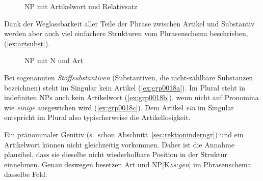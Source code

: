 \begin{figure}[!htbp]
  \centering
  \caption{NP mit Artikelwort und Relativsatz}
  \label{fig:grp7000}
\end{figure}

Dank der Weglassbarkeit aller Teile der Phrase zwischen Artikel und Substantiv werden aber auch viel einfachere Strukturen vom Phrasenschema beschrieben, \zB (\ref{ex:artsubst}).

\begin{exe}
\end{exe}

\begin{figure}[!htbp]
  \centering
  \caption{NP mit N und Art}
  \label{fig:artsubst}
\end{figure}


Bei sogenannten \textit{Stoffsubstantiven} (Substantiven, die nicht-zählbare Substanzen bezeichnen) steht im Singular kein Artikel (\ref{ex:grp0018a}).
Im Plural steht in indefiniten NPs auch kein Artikelwort (\ref{ex:grp0018b}), wenn nicht auf Pronomina wie \textit{einige} ausgewichen wird (\ref{ex:grp0018c}).
Dem Artikel \textit{ein} im Singular entspricht im Plural also typischerweise die Artikellosigkeit.

\begin{exe}
  \ex\label{ex:grp0018} 
  \begin{xlist}
  \end{xlist}
\end{exe}

Ein pränominaler Genitiv (s.\ schon Abschnitt~\ref{sec:rektioninderngr}) und ein Artikelwort können nicht gleichzeitig vorkommen.
Daher ist die Annahme plausibel, dass sie dieselbe nicht wiederholbare Position in der Struktur einnehmen.
Genau deswegen besetzen Art und NP[\textsc{Kas}:\textit{gen}] im Phrasenschema dasselbe Feld.


